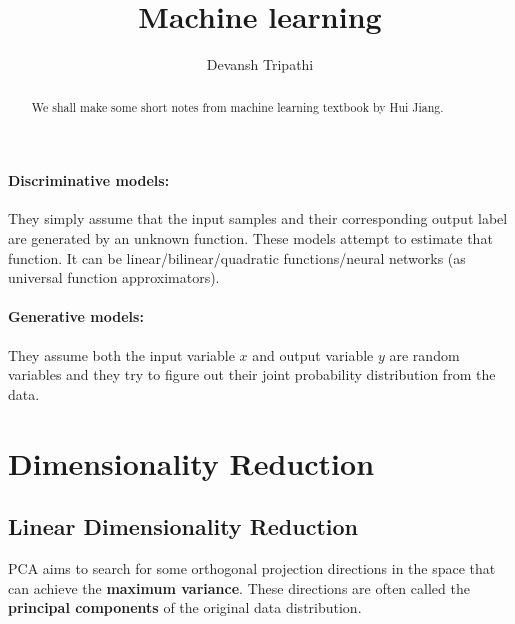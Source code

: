 \documentclass[12pt,reqno]{amsart}
\title{Machine learning}
\author{Devansh Tripathi}
\theoremstyle{plain}
\theoremstyle{definition}
\begin{document}
\begin{abstract}
    We shall make some short notes from machine learning textbook by Hui Jiang.
\end{abstract}
\maketitle
\paragraph{\bf Discriminative models:} They simply assume that the input samples and  their corresponding output label are generated by an unknown function. These models attempt to estimate that function. It can be linear/bilinear/quadratic functions/neural networks (as universal function approximators). 
\paragraph{\bf Generative models:} They assume both the input variable $x$ and output variable $y$ are random variables and they try to figure out their joint probability distribution from the data.
\section{Dimensionality Reduction}
\subsection{Linear Dimensionality Reduction}
PCA aims to search for some orthogonal projection directions in the space that can achieve the {\bf maximum variance}. These directions are often called the {\bf principal components} of the original data distribution.
\end{document}
